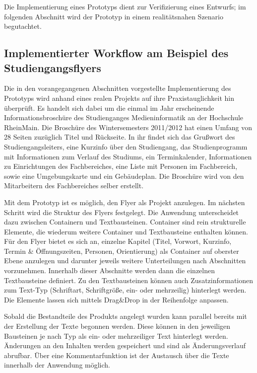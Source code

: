 \secbar

Die Implementierung eines Prototyps dient zur Verifizierung eines Entwurfs; im folgenden Abschnitt wird der Prototyp in einem realitätsnahen Szenario begutachtet.

\pagebreak

\subsection{Implementierter Workflow am Beispiel des Studiengangsflyers}

Die in den vorangegangenen Abschnitten vorgestellte Implementierung des Prototyps wird anhand eines realen Projekts auf ihre Praxistauglichkeit hin überprüft. Es handelt sich dabei um die einmal im Jahr erscheinende Informationsbroschüre des Studienganges Medieninformatik an der Hochschule RheinMain. Die Broschüre des Wintersemesters 2011/2012 hat einen Umfang von 28 Seiten zuzüglich Titel und Rückseite. In ihr findet sich das Grußwort des Studiengangsleiters, eine Kurzinfo über den Studiengang, das Studienprogramm mit Informationen zum Verlauf des Studiums, ein Terminkalender, Informationen zu Einrichtungen des Fachbereiches, eine Liste mit Personen im Fachbereich, sowie eine Umgebungskarte und ein Gebäudeplan. Die Broschüre wird von den Mitarbeitern des Fachbereiches selber erstellt.

\bigskip

Mit dem Prototyp ist es möglich, den Flyer als Projekt anzulegen. Im nächsten Schritt wird die Struktur des Flyers festgelegt. Die Anwendung unterscheidet dazu zwischen Containern und Textbausteinen. Container sind rein strukturelle Elemente, die wiederum weitere Container und Textbausteine enthalten können. Für den Flyer bietet es sich an, einzelne Kapitel (Titel, Vorwort, Kurzinfo, Termin \& Öffnungszeiten, Personen, Orientierung) als Container auf oberster Ebene anzulegen und darunter jeweils weitere Unterteilungen nach Abschnitten vorzunehmen. Innerhalb dieser Abschnitte werden dann die einzelnen Textbausteine definiert. Zu den Textbausteinen können auch Zusatzinformationen zum Text-Typ (Schriftart, Schriftgröße, ein- oder mehrzeilig) hinterlegt werden. Die Elemente lassen sich mittels Drag\&Drop in der Reihenfolge anpassen.

Sobald die Bestandteile des Produkts angelegt wurden kann parallel bereits mit der Erstellung der Texte begonnen werden. Diese können in den jeweiligen Bausteinen je nach Typ als ein- oder mehrzeiliger Text hinterlegt werden. Änderungen an den Inhalten werden gespeichert und sind als Änderungsverlauf abrufbar. Über eine Kommentarfunktion ist der Austausch über die Texte innerhalb der Anwendung möglich. 

